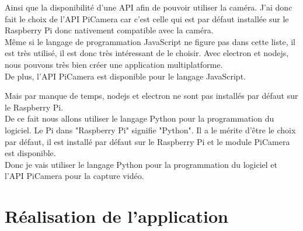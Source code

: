     \begin{flushleft}
        Ainsi que la disponibilité d'une API afin de pouvoir utiliser la caméra.
        J'ai donc fait le choix de l'API PiCamera car c'est celle qui est par défaut installée sur le Raspberry Pi donc nativement compatible avec la caméra.\\[0.2cm]
    
        Même si le langage de programmation JavaScript ne figure pas dans cette liste, il est très utilisé, il est donc très intéressant de le choisir.
        Avec electron et nodejs, nous pouvons très bien créer une application multiplatforme.\\[0.2cm]
        De plus, l'API PiCamera est disponible pour le langage JavaScript.
    
        Mais par manque de temps, nodejs et electron ne sont pas installés par défaut sur le Raspberry Pi.\\[0.2cm]
    
        De ce fait nous allons utiliser le langage Python pour la programmation du logiciel.
        Le Pi dans "Raspberry Pi" signifie "Python". Il a le mérite d'être le choix par défaut, il est installé par défaut sur le Raspberry Pi et le module PiCamera est disponible.\\[0.2cm]
    
        Donc je vais utiliser le langage Python pour la programmation du logiciel et l'API PiCamera pour la capture vidéo.
    \end{flushleft}

    
    \section{Réalisation de l'application}
        
        